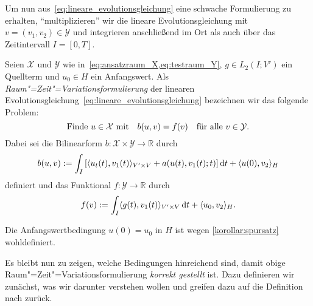 \documentclass[../main.tex]{subfiles}
\begin{document}
Um nun aus~\cref{eq:lineare_evolutionsgleichung} eine schwache Formulierung zu erhalten, \enquote{multiplizieren} wir die lineare Evolutionsgleichung mit $v = (v_{1}, v_{2}) \in \mathcal Y$ und integrieren anschließend im Ort als auch über das Zeitintervall $I = [0, T]$.

\begin{Definition}
\label{definition:absktrakte_raum_zeit_formulierung}
    Seien $\mathcal X$ und $\mathcal Y$ wie in~\cref{eq:ansatzraum_X,eq:testraum_Y}, $g \in L_{2}(I; V')$ ein Quellterm und $u_{0} \in H$ ein Anfangswert.
    Als \emph{Raum"=Zeit"=Variationsformulierung} der linearen Evolutionsgleichung~\cref{eq:lineare_evolutionsgleichung} bezeichnen wir das folgende Problem:
    \begin{equation}
        \label{eq:absktrakte_raum_zeit_formulierung}
        \text{Finde } u \in \mathcal X \text{ mit} \quad b(u, v) = f(v) \quad \fa v \in \mathcal Y.
    \end{equation}
    Dabei sei die Bilinearform $b \colon \mathcal X \times \mathcal Y \to \mathbb{R}$ durch
    \begin{equation}
        \label{eq:absktrakte_raum_zeit_formulierung:lhs}
        b(u, v) := \int_{I} \left[   \skp{u_{t}(t)}{v_{1}(t)}{V' \times V} + a(u(t), v_{1}(t); t)  \right] \diff t + \skp{u(0)}{v_{2}}{H}
    \end{equation}
    definiert und das Funktional $f \colon \mathcal Y \to \mathbb{R}$ durch
    \begin{equation}
        \label{eq:absktrakte_raum_zeit_formulierung:rhs}
        f(v) := \int_{I} \skp{g(t)}{v_{1}(t)}{V' \times V} \diff t + \skp{u_{0}}{v_{2}}{H}.
    \end{equation}
\end{Definition}

\begin{Bemerkung}
    Die Anfangswertbedingung $u(0) = u_{0}$ in $H$ ist wegen \cref{korollar:spursatz} wohldefiniert.
\end{Bemerkung}

Es bleibt nun zu zeigen, welche Bedingungen hinreichend sind, damit obige Raum"=Zeit"=Variationsformulierung \emph{korrekt gestellt} ist.
Dazu definieren wir zunächst, was wir darunter verstehen wollen und greifen dazu auf die Definition nach \textcite{hadamard1902problemes} zurück.
\end{document}
